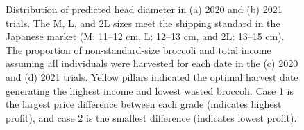 \begin{figure}[htb]
  \begin{center}
  \end{center}
  \caption[Distribution of predicted head diameter in 2020 and 2021 trials]{
    Distribution of predicted head diameter in (a) 2020 and (b) 2021 trials. 
    The M, L, and 2L sizes meet the shipping standard in the Japanese market 
    (M: 11–12 cm, L: 12–13 cm, and 2L: 13–15 cm). The proportion of non-standard-size broccoli and total income assuming all individuals were harvested for each date in the (c) 2020 and (d) 2021 trials. 
    Yellow pillars indicated the optimal harvest date generating the highest income and lowest wasted broccoli. 
    Case 1 is the largest price difference between each grade (indicates highest profit), and case 2 is the smallest difference (indicates lowest profit).
  }
  \label{fig:cp4.3}
\end{figure}